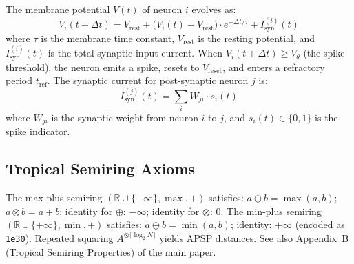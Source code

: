 \documentclass[10pt]{article}
\begin{document}
The membrane potential $V(t)$ of neuron $i$ evolves as:
\begin{equation}
V_i(t + \Delta t) = V_\mathrm{rest} + \bigl(V_i(t) - V_\mathrm{rest}\bigr) \cdot e^{-\Delta t / \tau} + I_\mathrm{syn}^{(i)}(t)
\end{equation}
where $\tau$ is the membrane time constant, $V_\mathrm{rest}$ is the resting potential,
and $I_\mathrm{syn}^{(i)}(t)$ is the total synaptic input current.
When $V_i(t + \Delta t) \geq V_\theta$ (the spike threshold), the neuron emits a spike,
resets to $V_\mathrm{reset}$, and enters a refractory period $t_\mathrm{ref}$.
The synaptic current for post-synaptic neuron $j$ is:
\begin{equation}
I_\mathrm{syn}^{(j)}(t) = \sum_{i} W_{ji} \cdot s_i(t)
\end{equation}
where $W_{ji}$ is the synaptic weight from neuron $i$ to $j$, and $s_i(t) \in \{0, 1\}$
is the spike indicator.

\subsection{Tropical Semiring Axioms}

The max-plus semiring $(\mathbb{R} \cup \{-\infty\}, \max, +)$ satisfies:
$a \oplus b = \max(a, b)$; $a \otimes b = a + b$; identity for $\oplus$: $-\infty$;
identity for $\otimes$: $0$.
The min-plus semiring $(\mathbb{R} \cup \{+\infty\}, \min, +)$ satisfies:
$a \oplus b = \min(a, b)$; identity: $+\infty$ (encoded as \texttt{1e30}).
Repeated squaring $A^{\otimes \lceil \log_2 N \rceil}$ yields APSP distances.
See also Appendix~B (Tropical Semiring Properties) of the main paper.



\end{document}
